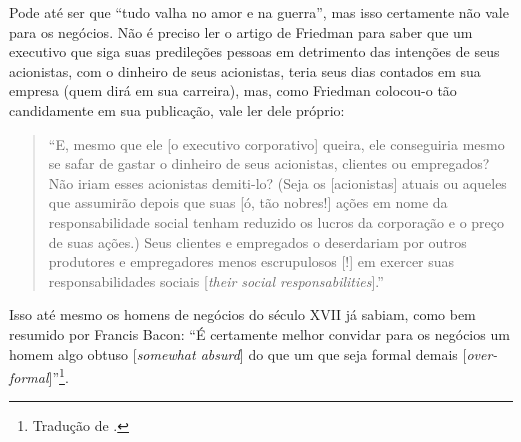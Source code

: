 \documentclass[12pt]{article}
\begin{document}

Pode até ser que ``tudo valha no amor e na guerra'', mas isso certamente não vale para os negócios. Não é preciso ler o artigo de Friedman para saber que um executivo que siga suas predileções pessoas em detrimento das intenções de seus acionistas, com o dinheiro de seus acionistas, teria seus dias contados em sua empresa (quem dirá em sua carreira), mas, como Friedman colocou-o tão candidamente em sua publicação, vale ler dele próprio:
\begin{quote}
    ``E, mesmo que ele [o executivo corporativo] queira, ele conseguiria mesmo se safar de gastar o dinheiro de seus acionistas, clientes ou empregados? Não iriam esses acionistas demiti-lo? (Seja os [acionistas] atuais ou aqueles que assumirão depois que suas [ó, tão nobres!] ações em nome da responsabilidade social tenham reduzido os lucros da corporação e o preço de suas ações.) Seus clientes e empregados o deserdariam por outros produtores e empregadores menos escrupulosos [!] em exercer suas responsabilidades sociais [\textit{their social responsabilities}].'' \cite[destaques meus]{Friedman1970}
\end{quote}

Isso até mesmo os homens de negócios do século XVII já sabiam, como bem resumido por Francis Bacon: ``É certamente melhor convidar para os negócios um homem algo obtuso [\textit{somewhat absurd}] do que um que seja formal demais [\textit{over-formal}]''\footnote{Tradução de \textcite[p. 64; destaques meus]{deOliveira2023}.}.
\end{document}
